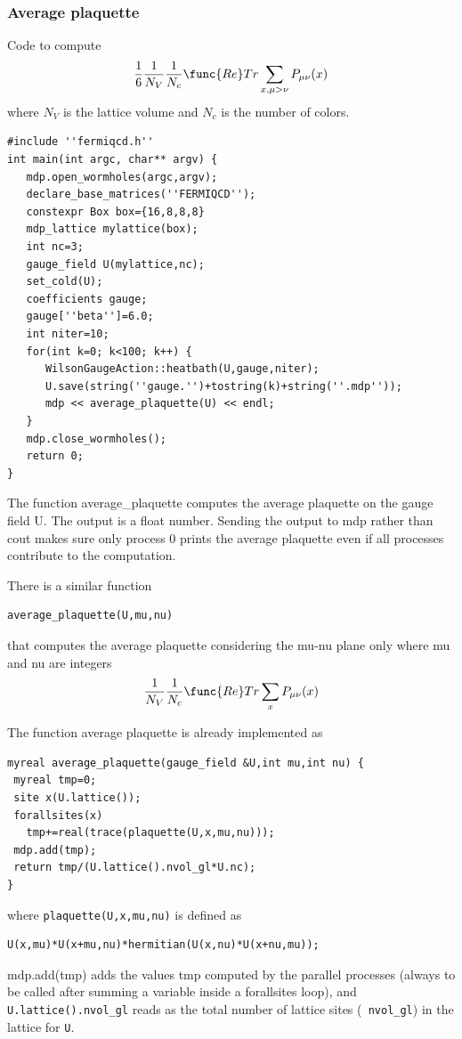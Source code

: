 \subsubsection{Average plaquette}

Code to compute 
\[
\frac 16\frac 1{N_V}\frac 1{N_c}\func{Re}Tr\sum_{x,\mu >\nu }P_{\mu \nu }(x) 
\]
where $N_V$ is the lattice volume and $N_c$ is the number of colors.
\begin{verbatim}
#include ''fermiqcd.h''
int main(int argc, char** argv) {
   mdp.open_wormholes(argc,argv);
   declare_base_matrices(''FERMIQCD'');
   constexpr Box box={16,8,8,8}
   mdp_lattice mylattice(box);
   int nc=3;
   gauge_field U(mylattice,nc);
   set_cold(U);
   coefficients gauge;
   gauge[''beta'']=6.0;
   int niter=10;
   for(int k=0; k<100; k++) {
      WilsonGaugeAction::heatbath(U,gauge,niter);
      U.save(string(''gauge.'')+tostring(k)+string(''.mdp''));
      mdp << average_plaquette(U) << endl;
   }
   mdp.close_wormholes();
   return 0;
}
\end{verbatim}

The function average\_plaquette computes the average plaquette on the gauge
field U. The output is a float number. Sending the output to mdp rather than
cout makes sure only process 0 prints the average plaquette even if all
processes contribute to the computation.

There is a similar function
\begin{verbatim}
average_plaquette(U,mu,nu)
\end{verbatim}

that computes the average plaquette considering the mu-nu plane only where
mu and nu are integers 
\[
\frac 1{N_V}\frac 1{N_c}\func{Re}Tr\sum_xP_{\mu \nu }(x) 
\]

The function average plaquette is already implemented as
\begin{verbatim}
myreal average_plaquette(gauge_field &U,int mu,int nu) {
 myreal tmp=0;
 site x(U.lattice());
 forallsites(x)
   tmp+=real(trace(plaquette(U,x,mu,nu)));
 mdp.add(tmp);
 return tmp/(U.lattice().nvol_gl*U.nc);
}
\end{verbatim}

where {\tt plaquette(U,x,mu,nu)} is defined as
\begin{verbatim}
U(x,mu)*U(x+mu,nu)*hermitian(U(x,nu)*U(x+nu,mu));
\end{verbatim}

mdp.add(tmp) adds the values tmp computed by the parallel processes (always
to be called after summing a variable inside a forallsites loop), and {\tt %
U.lattice().nvol\_gl} reads as the total number of lattice sites ({\tt %
nvol\_gl}) in the lattice for {\tt U}.

